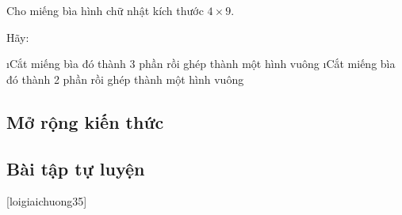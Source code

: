 \begin{vd}
	Cho miếng bìa hình chữ nhật kích thước $4 \times 9$. 
	
	Hãy: 
	\begin{enumerate}[a), leftmargin=*]
		\i Cắt miếng bìa đó thành 3 phần rồi ghép thành một hình vuông
		\i Cắt miếng bìa đó thành 2 phần rồi ghép thành một hình vuông
	\end{enumerate}
\end{vd}
\subsection{Mở rộng kiến thức}
\subsection{Bài tập tự luyện}
[loigiaichuong35]
